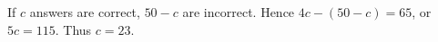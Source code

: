 If $c$ answers are correct, $50-c$ are incorrect. Hence $4c-(50-c)=65$, or $5c=115$. Thus $\boxed{c=23}$.
